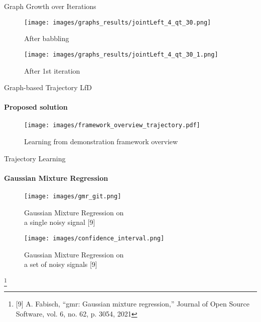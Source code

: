 \documentclass[aspectratio=169]{beamer}
\newcommand\blfootnote[1]{%
	\begingroup
	\renewcommand\thefootnote{}\footnote{#1}%
	\addtocounter{footnote}{-1}%
	\endgroup
}
\begin{document}
\begin{frame}{Graph Growth over Iterations}
	\begin{minipage}{0.49\linewidth}	
		\begin{figure}[h!]
			\texttt{[image: images/graphs\_results/jointLeft\_4\_qt\_30.png]}
			\label{fig:object_representation}
			\vspace{-0.5em}
			\caption{After babbling}
		\end{figure}
	\end{minipage}
	\begin{minipage}{0.49\linewidth}	
		\begin{figure}[h!]
			\texttt{[image: images/graphs\_results/jointLeft\_4\_qt\_30\_1.png]}
			\label{fig:object_representation}
			\vspace{-0.5em}
			\caption{After 1st iteration}
		\end{figure}
	\end{minipage}
\end{frame}

\begin{frame}{Graph-based Trajectory LfD}
	\framesubtitle{Proposed solution}
	\begin{figure}[tp]
		\centering
		\texttt{[image: images/framework\_overview\_trajectory.pdf]}
		\vspace{-0.4cm}
		\caption{Learning from demonstration framework overview}
		\label{fig:framework_overview}
	\end{figure}
\end{frame}

\begin{frame}{Trajectory Learning}
	\framesubtitle{Gaussian Mixture Regression}
	\begin{minipage}{0.49\linewidth}	
	\begin{figure}[h!]
		\texttt{[image: images/gmr\_git.png]}
		\caption{Gaussian Mixture Regression on \\ a single noisy signal [9]}
	\end{figure}
	\end{minipage}\hfill		
	\begin{minipage}{0.49\linewidth}	
	\begin{figure}[h!]
		\texttt{[image: images/confidence\_interval.png]}
		\caption{Gaussian Mixture Regression on \\ a set of noisy signals [9]}
	\end{figure}
	\end{minipage}
	\blfootnote{[9] A. Fabisch, “gmr: Gaussian mixture regression,” Journal of Open Source Software, vol. 6, no. 62, p. 3054, 2021}
\end{frame}
\end{document}
